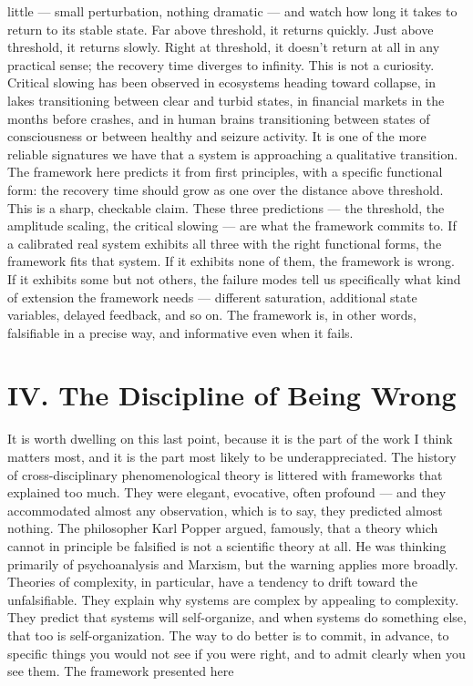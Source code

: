 \documentclass[12pt]{article}
\begin{document}
little --- small perturbation, nothing dramatic --- and watch how long it takes to return to its stable state. Far above threshold, it returns quickly. Just above threshold, it returns slowly. Right at threshold, it doesn't return at all in any practical sense; the recovery time diverges to infinity. This is not a curiosity. Critical slowing has been observed in ecosystems heading toward collapse, in lakes transitioning between clear and turbid states, in financial markets in the months before crashes, and in human brains transitioning between states of consciousness or between healthy and seizure activity. It is one of the more reliable signatures we have that a system is approaching a qualitative transition. The framework here predicts it from first principles, with a specific functional form: the recovery time should grow as one over the distance above threshold. This is a sharp, checkable claim. These three predictions --- the threshold, the amplitude scaling, the critical slowing --- are what the framework commits to. If a calibrated real system exhibits all three with the right functional forms, the framework fits that system. If it exhibits none of them, the framework is wrong. If it exhibits some but not others, the failure modes tell us specifically what kind of extension the framework needs --- different saturation, additional state variables, delayed feedback, and so on. The framework is, in other words, falsifiable in a precise way, and informative even when it fails.


\section*{IV. The Discipline of Being Wrong}

It is worth dwelling on this last point, because it is the part of the work I think matters most, and it is the part most likely to be underappreciated. The history of cross-disciplinary phenomenological theory is littered with frameworks that explained too much. They were elegant, evocative, often profound --- and they accommodated almost any observation, which is to say, they predicted almost nothing. The philosopher Karl Popper argued, famously, that a theory which cannot in principle be falsified is not a scientific theory at all. He was thinking primarily of psychoanalysis and Marxism, but the warning applies more broadly. Theories of complexity, in particular, have a tendency to drift toward the unfalsifiable. They explain why systems are complex by appealing to complexity. They predict that systems will self-organize, and when systems do something else, that too is self-organization. The way to do better is to commit, in advance, to specific things you would not see if you were right, and to admit clearly when you see them. The framework presented here
\end{document}
